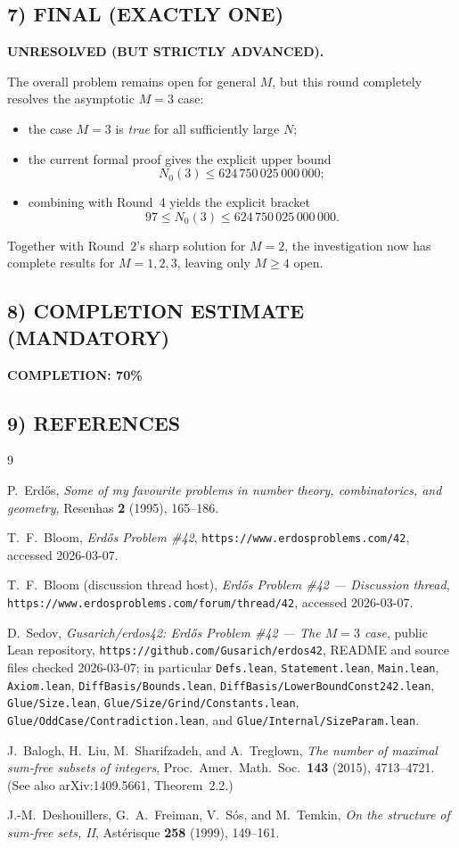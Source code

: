 \subsection{7) FINAL (EXACTLY ONE)}
\textbf{UNRESOLVED (BUT STRICTLY ADVANCED).}

The overall problem remains open for general \(M\), but this round completely resolves the asymptotic \(M=3\) case:
\begin{itemize}
  \item the case \(M=3\) is \emph{true} for all sufficiently large \(N\);
  \item the current formal proof gives the explicit upper bound
  \[
  N_0(3)\le 624\,750\,025\,000\,000;
  \]
  \item combining with Round~4 yields the explicit bracket
  \[
  97\le N_0(3)\le 624\,750\,025\,000\,000.
  \]
\end{itemize}
Together with Round~2's sharp solution for \(M=2\), the investigation now has complete results for \(M=1,2,3\), leaving only \(M\ge 4\) open.

\subsection{8) COMPLETION ESTIMATE (MANDATORY)}
\textbf{COMPLETION: 70\%}

\subsection{9) REFERENCES}
\begin{thebibliography}{9}

P.~Erd\H{o}s,
\emph{Some of my favourite problems in number theory, combinatorics, and geometry},
Resenhas \textbf{2} (1995), 165--186.

T.~F.~Bloom,
\emph{Erd\H{o}s Problem \#42},
\texttt{https://www.erdosproblems.com/42},
accessed 2026-03-07.

T.~F.~Bloom (discussion thread host),
\emph{Erd\H{o}s Problem \#42 --- Discussion thread},
\texttt{https://www.erdosproblems.com/forum/thread/42},
accessed 2026-03-07.

D.~Sedov,
\emph{Gusarich/erdos42: Erd\H{o}s Problem \#42 --- The \(M=3\) case},
public Lean repository, \texttt{https://github.com/Gusarich/erdos42},
README and source files checked 2026-03-07; in particular
\texttt{Defs.lean}, \texttt{Statement.lean}, \texttt{Main.lean}, \texttt{Axiom.lean},
\texttt{DiffBasis/Bounds.lean}, \texttt{DiffBasis/LowerBoundConst242.lean},
\texttt{Glue/Size.lean}, \texttt{Glue/Size/Grind/Constants.lean},
\texttt{Glue/OddCase/Contradiction.lean}, and \texttt{Glue/Internal/SizeParam.lean}.

J.~Balogh, H.~Liu, M.~Sharifzadeh, and A.~Treglown,
\emph{The number of maximal sum-free subsets of integers},
Proc.\ Amer.\ Math.\ Soc.\ \textbf{143} (2015), 4713--4721.
(See also arXiv:1409.5661, Theorem~2.2.)

J.-M.~Deshouillers, G.~A.~Freiman, V.~S\'os, and M.~Temkin,
\emph{On the structure of sum-free sets, II},
Ast\'erisque \textbf{258} (1999), 149--161.

\end{thebibliography}
